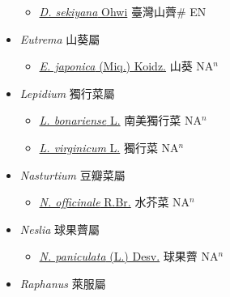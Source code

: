 \begin{itemize}
  \begin{itemize}
        \item[] \href{http://www.theplantlist.org/tpl1.1/search?q=Draba+sekiyana}{\textit{D. sekiyana} Ohwi}   臺灣山薺\# EN
  \end{itemize}
 \item[] \textit{Eutrema} 山葵屬
                    
  \begin{itemize}
        \item[] \href{http://www.theplantlist.org/tpl1.1/search?q=Eutrema+japonica}{\textit{E. japonica} (Miq.) Koidz.}   山葵 NA$^n$
  \end{itemize}
 \item[] \textit{Lepidium} 獨行菜屬
                    
  \begin{itemize}
        \item[] \href{http://www.theplantlist.org/tpl1.1/search?q=Lepidium+bonariense}{\textit{L. bonariense} L.}   南美獨行菜 NA$^n$
        \item[] \href{http://www.theplantlist.org/tpl1.1/search?q=Lepidium+virginicum}{\textit{L. virginicum} L.}   獨行菜 NA$^n$
  \end{itemize}
 \item[] \textit{Nasturtium} 豆瓣菜屬
                    
  \begin{itemize}
        \item[] \href{http://www.theplantlist.org/tpl1.1/search?q=Nasturtium+officinale}{\textit{N. officinale} R.Br.}   水芥菜 NA$^n$
  \end{itemize}
 \item[] \textit{Neslia} 球果薺屬
                    
  \begin{itemize}
        \item[] \href{http://www.theplantlist.org/tpl1.1/search?q=Neslia+paniculata}{\textit{N. paniculata} (L.) Desv.}   球果薺 NA$^n$
  \end{itemize}
 \item[] \textit{Raphanus} 萊服屬
                    

\end{itemize}
